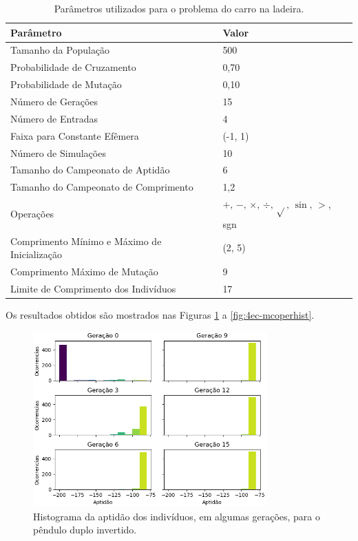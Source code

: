 \begin{table}[H]
	\centering
	\begin{tabular}{l|l} \toprule
		{Parâmetro} & {Valor} \\ \midrule
		{Tamanho da População} & {500} \\
		{Probabilidade de Cruzamento} & {0,70} \\
		{Probabilidade de Mutação} & {0,10} \\
		{Número de Gerações} & {15} \\
		{Número de Entradas} & {4} \\
		{Faixa para Constante Efêmera} & {(-1, 1)} \\
		{Número de Simulações} & {10} \\
		{Tamanho do Campeonato de Aptidão} & {6} \\
		{Tamanho do Campeonato de Comprimento} & {1,2} \\
		{Operações} & {$+,\,-,\,\times,\,\div,\,\sqrt{},\,\sin,\,>$, sgn} \\
		{Comprimento Mínimo e Máximo de Inicialização} & {(2, 5)} \\
		{Comprimento Máximo de Mutação} & {9} \\
		{Limite de Comprimento dos Indivíduos} & {17} \\
		\bottomrule
	\end{tabular}
	\caption{Parâmetros utilizados para o problema do carro na ladeira.}\label{tab:4ec-mcparam}
\end{table}

Os resultados obtidos são mostrados nas Figuras \ref{fig:4ec-mcapthist} a \ref{fig:4ec-mcoperhist}.

\begin{figure}[H]
	\centering
	\includegraphics[width=0.8\textwidth]{02_desenvolvimento/04_EC_Fig_MCAptHist.png}
	\caption{Histograma da aptidão dos indivíduos, em algumas gerações, para o pêndulo duplo invertido.}
	\label{fig:4ec-mcapthist}
\end{figure}

